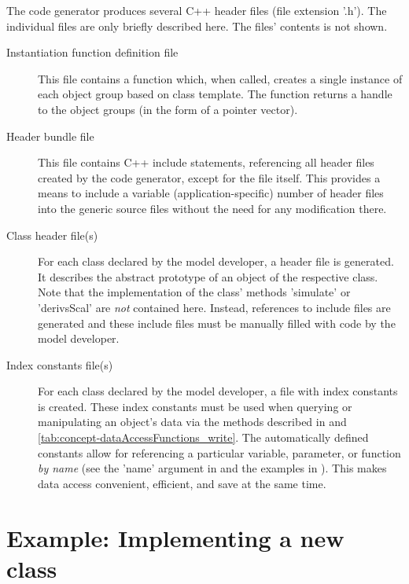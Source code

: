 The code generator produces several C++ header files (file extension '.h'). The individual files are only briefly described here. The files' contents is not shown.
\begin{description}
  \item [Instantiation function definition file] This file contains a function which, when called, creates a single instance of each object group based on class template. The function returns a handle to the object groups (in the form of a pointer vector).
  \item [Header bundle file] This file contains C++ include statements, referencing all header files created by the code generator, except for the file itself. This provides a means to include a variable (application-specific) number of header files into the generic source files without the need for any modification there.
  \item [Class header file(s)] For each class declared by the model developer, a header file is generated. It describes the abstract prototype of an object of the respective class. Note that the implementation of the class' methods 'simulate' or 'derivsScal' are  \emph{not} contained here. Instead, references to include files are generated and these include files must be manually filled with code by the model developer.
  \item [Index constants file(s)] For each class declared by the model developer, a file with index constants is created. These index constants must be used when querying or manipulating an object's data via the methods described in  and \ref{tab:concept-dataAccessFunctions_write}. The automatically defined constants allow for referencing a particular variable, parameter, or function \emph{by name} (see the 'name' argument in  and the examples in ). This makes data access convenient, efficient, and save at the same time.
\end{description}


\FloatBarrier

\section{Example: Implementing a new class} \label{sec:concept-classDef}

